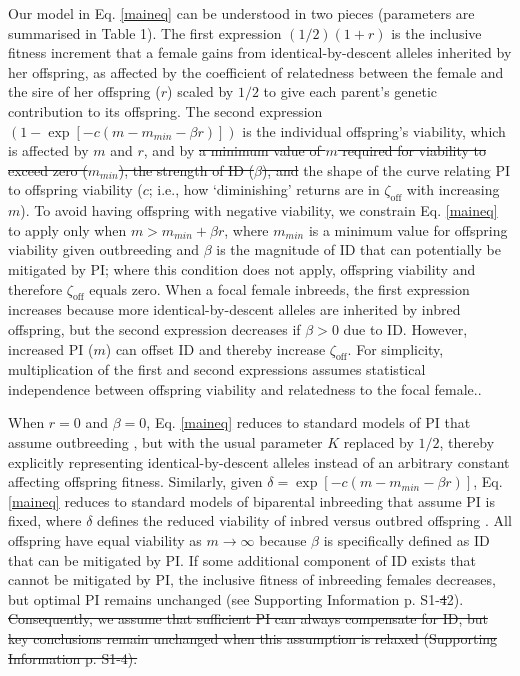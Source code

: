 \documentclass[12pt]{article}
\begin{document}
Our model in Eq. \ref{maineq} can be understood in two pieces (parameters are summarised in Table 1). The first expression $\left(1/2\right) \left(1 + r\right)$ is the inclusive fitness increment that a female gains from identical-by-descent alleles inherited by her offspring, as affected by the coefficient of relatedness between the female and the sire of her offspring ($r$) scaled by $1/2$ to give each parent's genetic contribution to its offspring. The second expression $\left(1 - \exp\left[-c\left(m-m_{min}-\beta r\right)\right]\right)$ is the individual offspring's viability, which is affected by $m$ and $r$, and by {\color{red}\st{a minimum value of $m$ required for viability to exceed zero ($m_{min}$), the strength of ID ($\beta$), and}} the shape of the curve relating PI to offspring viability ($c$; i.e., how `diminishing' returns are in $\zeta_{\textrm{off}}$ with increasing $m$). {\color{blue}To avoid having offspring with negative viability, we constrain Eq. \ref{maineq} to apply only when $m > m_{min} + \beta r$, where $m_{min}$ is a minimum value for offspring viability given outbreeding and $\beta$ is the magnitude of ID that can potentially be mitigated by PI; where this condition does not apply, offspring viability and therefore $\zeta_{\textrm{off}}$ equals zero.} When a focal female inbreeds, the first expression increases because more identical-by-descent alleles are inherited by inbred offspring, but the second expression decreases if $\beta>0$ due to ID. However, increased PI ($m$) can offset ID and thereby increase $\zeta_{\textrm{off}}$. {\color{blue}For simplicity, multiplication of the first and second expressions assumes statistical independence between offspring viability and relatedness to the focal female.}.

When $r=0$ and $\beta=0$, Eq. \ref{maineq} reduces to standard models of PI that assume outbreeding \cite[e.g.,][]{Macnair1978, Parker1978}, but with the usual parameter $K$ replaced by $1/2$, thereby explicitly representing identical-by-descent alleles instead of an arbitrary constant affecting offspring fitness. Similarly, given $\delta = \exp\left[-c\left(m-m_{min}-\beta r\right)\right]$, Eq. \ref{maineq} reduces to standard models of biparental inbreeding that assume PI is fixed, where $\delta$ defines the reduced viability of inbred versus outbred offspring \cite[see][]{Kokko2006, Parker2006, Duthie2015a}.  All offspring have equal viability as $m \to \infty$ {\color{blue}because $\beta$ is specifically defined as ID that can be mitigated by PI. If some additional component of ID exists that cannot be mitigated by PI, the inclusive fitness of inbreeding females decreases, but optimal PI remains unchanged (see Supporting Information p. S1-{\color{red}\st{4}}{\color{blue}2}).}{\color{red}\st{ Consequently, we assume that sufficient PI can always compensate for ID, but key conclusions remain unchanged when this assumption is relaxed (Supporting Information p. S1-4).}}
\end{document}
